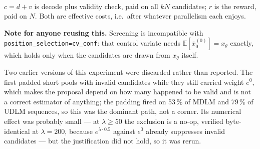 \documentclass[11pt]{article}
\begin{document}
\begin{table}[htbp]
\centering
\footnotesize
\setlength{\tabcolsep}{4pt}
\\[0.4em] \begin{minipage}{0.92\textwidth}\footnotesize $c = d + v$ is decode plus validity check, paid on all $kN$ candidates; $r$ is the reward, paid on $N$. Both are effective costs, i.e.\ after whatever parallelism each enjoys.\end{minipage}
\caption{Screening overhead $\rho$ against the reward-to-scan cost ratio $\theta$. The rows are the model evaluated at illustrative $\theta$; only the QM9 row is measured.}
\label{tab:ov-costmodel}
\end{table}


\textbf{Note for anyone reusing this.} Screening is incompatible with
\texttt{position\_selection=cv\_conf}: that control variate needs
$\mathbb{E}[\bar{x}_0^{(0)}] = x_\theta$ exactly, which holds only when the
candidates are drawn from $x_\theta$ itself.

Two earlier versions of this experiment were discarded rather than reported.
The first padded short pools with invalid candidates while they still carried
weight $e^{0}$, which makes the proposal depend on how many happened to be valid
and is not a correct estimator of anything; the padding fired on 53\,\% of
MDLM and 79\,\% of UDLM sequences, so this was the dominant path, not a corner.
Its numerical effect was probably small --- at $\lambda \geq 50$ the exclusion
is a no-op, verified byte-identical at $\lambda = 200$, because
$e^{\lambda \cdot 0.5}$ against $e^{0}$ already suppresses invalid candidates ---
but the justification did not hold, so it was rerun.
\end{document}
